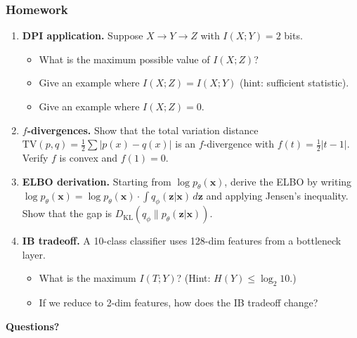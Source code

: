 \documentclass[aspectratio=169]{beamer}
\begin{document}
\begin{frame}
\frametitle{Homework}

\begin{enumerate}\setlength{\itemsep}{3pt}
  \item \textbf{DPI application.} Suppose $X \to Y \to Z$ with $I(X;Y) = 2$ bits.
    \begin{itemize}\setlength{\itemsep}{0pt}
      \item[(a)] What is the maximum possible value of $I(X;Z)$?
      \item[(b)] Give an example where $I(X;Z) = I(X;Y)$ (hint: sufficient statistic).
      \item[(c)] Give an example where $I(X;Z) = 0$.
    \end{itemize}

  \item \textbf{$f$-divergences.} Show that the total variation distance
    $\text{TV}(p,q) = \frac{1}{2}\sum|p(x) - q(x)|$ is an $f$-divergence
    with $f(t) = \frac{1}{2}|t - 1|$. Verify $f$ is convex and $f(1) = 0$.

  \item \textbf{ELBO derivation.} Starting from $\log p_\theta(\mathbf{x})$, derive the ELBO
    by writing $\log p_\theta(\mathbf{x}) = \log p_\theta(\mathbf{x}) \cdot \int q_\phi(\mathbf{z}|\mathbf{x})\,d\mathbf{z}$
    and applying Jensen's inequality. Show that the gap is $D_{\text{KL}}(q_\phi \| p_\theta(\mathbf{z}|\mathbf{x}))$.

  \item \textbf{IB tradeoff.} A 10-class classifier uses 128-dim features from a bottleneck layer.
    \begin{itemize}\setlength{\itemsep}{0pt}
      \item[(a)] What is the maximum $I(T;Y)$? (Hint: $H(Y) \leq \log_2 10$.)
      \item[(b)] If we reduce to 2-dim features, how does the IB tradeoff change?
    \end{itemize}
\end{enumerate}
\end{frame}

\begin{frame}
\begin{center}
  {\Huge\bfseries\textcolor{popblue}{Questions?}}
\end{center}
\end{frame}
\end{document}
